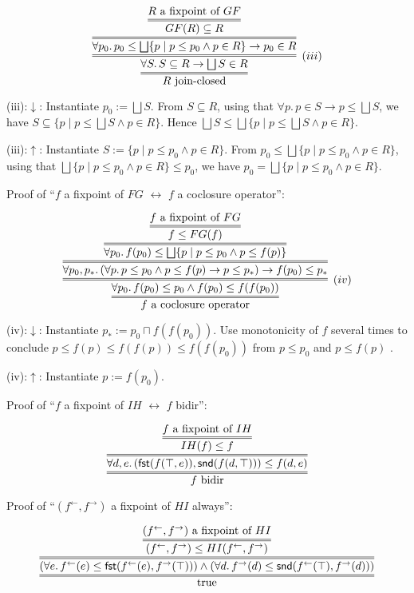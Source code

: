 \documentclass[9pt]{article}
\newcommand{\ff}{{f^{\rightarrow}}}
\newcommand{\fb}{{f^{\leftarrow}}}
\newcommand{\bigjoin}{\bigsqcup}
\newcommand{\meet}{\sqcap}
\newcommand{\con}{\wedge}
\newcommand{\imp}{\to}
\newcommand{\equ}{\leftrightarrow}
\newcommand{\fst}{\mathsf{fst}}
\newcommand{\snd}{\mathsf{snd}}
\begin{document}
\[
\infer={R \textrm{~join-closed}}{
  \infer=[(iii)]{\forall S.\, S \subseteq R \imp \bigjoin S \in R}{    
    \infer={\forall p_0.\, p_0 \leq \bigjoin \{p \mid p \leq p_0 \con p \in R\} \imp p_0 \in R}{
      \infer={GF(R) \subseteq R}{
        R \textrm{~a fixpoint of $GF$}
      }  
    }
  }
}  
\]

(iii):$\downarrow$: Instantiate $p_0 := \bigjoin S$. From
$S \subseteq R$, using that $\forall p.\, p \in S \imp p \leq \bigjoin S$,
we have $S \subseteq \{p \mid p \leq \bigjoin S \con p \in
R\}$. Hence
$\bigjoin S \leq \bigjoin \{p \mid p \leq \bigjoin S \con p \in R\}$.

(iii):$\uparrow$: Instantiate
$S := \{p \mid p \leq p_0 \con p \in R\}$.  From
$p_0 \leq \bigjoin \{p \mid p \leq p_0 \con p \in R\}$, using that
$\bigjoin \{p \mid p \leq p_0 \con p \in R\} \leq p_0$,
we have $p_0 = \bigjoin \{p \mid p \leq p_0 \con p \in R\}$.

\bigskip

Proof of ``$f$ a fixpoint of $FG$ $\equ$ $f$ a coclosure operator'':

\[
\infer={f \textrm{~a coclosure operator}}{
  \infer=[(iv)]{\forall p_0.\, f(p_0) \leq p_0 \con f(p_0) \leq f(f(p_0))}{
    \infer={\forall p_0, p_*.\, (\forall p.\, p \leq p_0 \con p \leq f(p) \imp p \leq p_*) \imp f(p_0) \leq p_*}{
      \infer={\forall p_0.\, f(p_0) \leq \bigjoin \{p \mid p \leq p_0 \con p \leq f(p)\}}{
        \infer={f \leq FG(f)}{
           f \textrm{~a fixpoint of $FG$}
        }
      }
    }
  }
}  
\]

(iv):$\downarrow$: Instantiate $p_* := p_0 \meet f(f(p_0))$. Use
monotonicity of $f$ several times to conclude $p \leq f(p) \leq f(f(p)) \leq  f(f(p_0))$ from
$p \leq p_0$ and $p \leq f(p)$ .

(iv):$\uparrow$: Instantiate $p := f(p_0)$.

\bigskip

Proof of ``$f$ a fixpoint of $IH$ $\equ$ $f$ bidir'':

\[
\infer={f \textrm{~bidir}}{
  \infer={\forall d,e.\, (\fst(f(\top,e)),\snd(f(d,\top))) \leq f(d,e)}{
    \infer={IH(f) \leq f}{
      f \textrm{~a fixpoint of $IH$}}{
    }
  }
}
\]


\bigskip

Proof of ``$(\fb,\ff)$ a fixpoint of $HI$ always'':

\[
\infer={\textrm{true}}{
  \infer={(\forall e.\, \fb(e) \leq \fst(\fb(e),\ff(\top))) 
    \con (\forall d.\, \ff(d) \leq \snd(\fb(\top),\ff(d)))}{
    \infer={(\fb,\ff) \leq HI(\fb,\ff)}{
    (\fb,\ff) \textrm{~a fixpoint of $HI$}
    }
  }
}  
\]  
\end{document}

